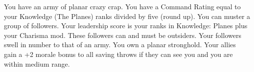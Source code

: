{You have an army of planar crazy crap.}
{You have a Command Rating equal to your Knowledge (The Planes) ranks divided by five (round up).}
{You can muster a group of followers. Your leadership score is your ranks in Knowledge: Planes plus your Charisma mod. These followers can and must be outsiders.}
{Your followers swell in number to that of an army.}
{You own a planar stronghold.}
{Your allies gain a +2 morale bonus to all saving throws if they can see you and you are within medium range.}